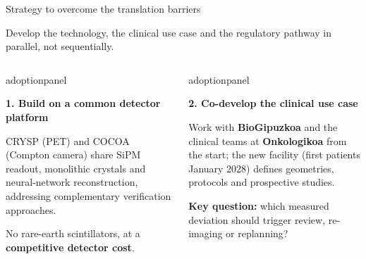 \documentclass[aspectratio=169,11pt]{beamer}
\newcommand{\hi}[1]{\textcolor{crRed}{#1}}
\begin{document}
\begin{frame}{Strategy to overcome the translation barriers}

{\small Develop the technology, the clinical use case and the regulatory pathway \hi{in parallel}, not sequentially.\par}
\vspace{0.08cm}
\begin{columns}[T,onlytextwidth]
\begin{beamercolorbox}[sep=6pt,wd=\linewidth]{adoptionpanel}
\begin{minipage}[t][2.45cm][t]{\linewidth}\raggedright
{\footnotesize\bfseries\color{crBlue}1. Build on a common detector platform\par}
\vspace{0.07cm}
{\scriptsize CRYSP (PET) and COCOA (Compton camera) share SiPM readout, monolithic crystals and neural-network reconstruction, addressing complementary verification approaches.\par\vspace{0.06cm}
No rare-earth scintillators, at a \textbf{competitive detector cost}.\par}
\end{minipage}
\end{beamercolorbox}
\begin{beamercolorbox}[sep=6pt,wd=\linewidth]{adoptionpanel}
\begin{minipage}[t][2.45cm][t]{\linewidth}\raggedright
{\footnotesize\bfseries\color{crBlue}2. Co-develop the clinical use case\par}
\vspace{0.07cm}
{\scriptsize Work with \textbf{BioGipuzkoa} and the clinical teams at \textbf{Onkologikoa} from the start; the new facility (first patients January 2028) defines geometries, protocols and prospective studies.\par\vspace{0.06cm}
\textbf{Key question:} which measured deviation should trigger review, re-imaging or replanning?\par}
\end{minipage}
\end{beamercolorbox}
\end{columns}
\par\vspace{0.12cm}
\begin{columns}[T,onlytextwidth]

\end{columns}
\end{frame}
\end{document}
